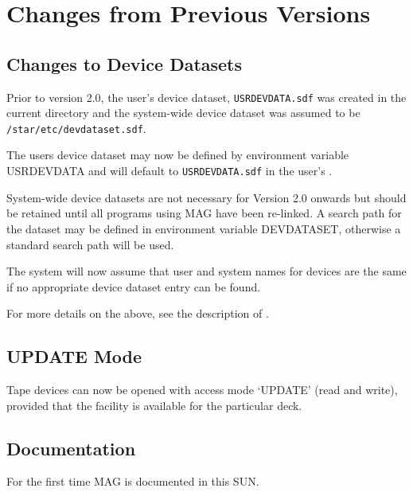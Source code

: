 \section{Changes from Previous Versions}
\subsection{Changes to Device Datasets}
Prior to version 2.0, the user's device dataset, {\tt USRDEVDATA.sdf} was
created in the current directory and the system-wide device dataset was assumed
to be {\tt /star/etc/devdataset.sdf}.

The users device dataset may now be defined by environment variable USRDEVDATA
and will default to {\tt USRDEVDATA.sdf} in the user's
.

System-wide device datasets are not necessary for Version 2.0 onwards but
should be retained until all programs using MAG have been re-linked.
A search path for the dataset may be defined in environment variable
DEVDATASET, otherwise a standard search path will be used.

The system will now assume that user and system names for devices are the
same if no appropriate device dataset entry can be found.

For more details on the above, see the description of
.

\subsection{UPDATE Mode}
Tape devices can now be opened with access mode `UPDATE' (read and write),
provided that the facility is available for the particular deck.

\subsection{Documentation}
For the first time MAG is documented in this SUN.

